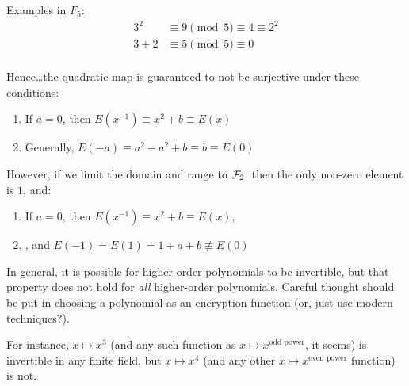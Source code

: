 \begin{Answer}
\noindent
Examples in $F_5$:
\begin{align*}
  3^2 &\equiv 9 \pmod 5 \equiv 4 \equiv 2^2\\
  3 + 2 &\equiv 5 \pmod 5 \equiv 0\\
\end{align*}

\noindent
Hence\ldots the quadratic map 
is guaranteed to not be surjective under these conditions:

\begin{enumerate}
\item If $a = 0$, then $E(x^{-1}) \equiv x^2 + b \equiv E(x)$
\item Generally, $E(-a) \equiv a^{2} - a^{2} + b \equiv b \equiv E(0)$ 
\end{enumerate}

\bigskip
\noindent
\color{zaffre}
However, if we limit the domain and range to $\mathcal{F}_2$, then the only non-zero element is $1$, and:
\begin{enumerate}
  \item If $a = 0$, then $E(x^{-1}) \equiv x^2 + b \equiv E(x)$, 
  \item {}, and $E(-1) = E(1) = 1 + a + b \nequiv E(0)$ 
\end{enumerate}
\color{black}
\bigskip
\noindent
In general, it is possible for higher-order polynomials to be invertible, but that property does not hold for \emph{all}
higher-order polynomials. Careful thought should be put in choosing a polynomial as an encryption function (or, just use modern
techniques?).

\noindent
For instance, $x \mapsto x^3$ (and any such function as $x \mapsto x^{\text{odd power}}$, it seems)
is invertible in any finite field, but $x \mapsto x^4$ (and any other $x \mapsto x^{\text{even power}}$ function) is not.
\end{Answer}
